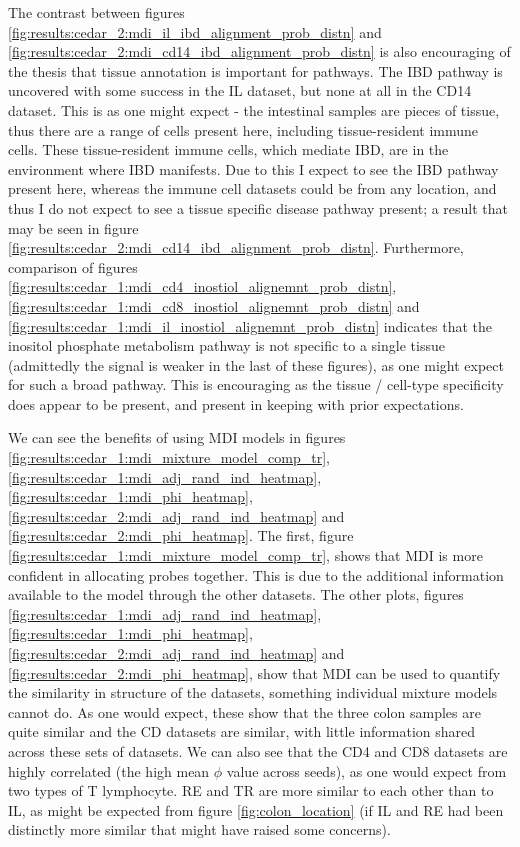 \documentclass[12pt]{article} %
\begin{document}
	The contrast between figures \ref{fig:results:cedar_2:mdi_il_ibd_alignment_prob_distn} and \ref{fig:results:cedar_2:mdi_cd14_ibd_alignment_prob_distn} is also encouraging of the thesis that tissue annotation is important for pathways. The IBD pathway is uncovered with some success in the IL dataset, but none at all in the CD14 dataset. This is as one might expect - the intestinal samples are pieces of tissue, thus there are a range of cells present here, including tissue-resident immune cells. These tissue-resident immune cells, which mediate IBD, are in the environment where IBD manifests. Due to this I expect to see the IBD pathway present here, whereas the immune cell datasets could be from any location, and thus I do not expect to see a tissue specific disease pathway present; a result that may be seen in figure \ref{fig:results:cedar_2:mdi_cd14_ibd_alignment_prob_distn}. Furthermore, comparison of figures \ref{fig:results:cedar_1:mdi_cd4_inostiol_alignemnt_prob_distn},  \ref{fig:results:cedar_1:mdi_cd8_inostiol_alignemnt_prob_distn} and \ref{fig:results:cedar_1:mdi_il_inostiol_alignemnt_prob_distn} indicates that the inositol phosphate metabolism pathway is not specific to a single tissue (admittedly the signal is weaker in the last of these figures), as one might expect for such a broad pathway. This is encouraging as the tissue / cell-type specificity does appear to be present, and present in keeping with prior expectations.
	
	We can see the benefits of using MDI models in figures \ref{fig:results:cedar_1:mdi_mixture_model_comp_tr}, \ref{fig:results:cedar_1:mdi_adj_rand_ind_heatmap}, \ref{fig:results:cedar_1:mdi_phi_heatmap}, \ref{fig:results:cedar_2:mdi_adj_rand_ind_heatmap} and \ref{fig:results:cedar_2:mdi_phi_heatmap}. The first, figure \ref{fig:results:cedar_1:mdi_mixture_model_comp_tr}, shows that MDI is more confident in allocating probes together. This is due to the additional information available to the model through the other datasets. The other plots, figures \ref{fig:results:cedar_1:mdi_adj_rand_ind_heatmap}, \ref{fig:results:cedar_1:mdi_phi_heatmap}, \ref{fig:results:cedar_2:mdi_adj_rand_ind_heatmap} and \ref{fig:results:cedar_2:mdi_phi_heatmap}, show that MDI can be used to quantify the similarity in structure of the datasets, something individual mixture models cannot do. As one would expect, these show that the three colon samples are quite similar and the CD datasets are similar, with little information shared across these sets of datasets. We can also see that the CD4 and CD8 datasets are highly correlated (the high mean $\phi$ value across seeds), as one would expect from two types of T lymphocyte. RE and TR are more similar to each other than to IL, as might be expected from figure \ref{fig:colon_location} (if IL and RE had been distinctly more similar that might have raised some concerns).
	
\end{document}
